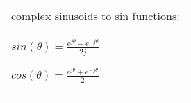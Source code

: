 \begin{tabular}{@{}L@{}}
complex sinusoids to sin functions: \\

$
sin(\theta) = \frac{
e^{j\theta}
- e^{-j\theta}
}{2j}
$

$
cos(\theta) = \frac{
e^{j\theta}
+ e^{-j\theta}
}{2}
$
\end{tabular}
